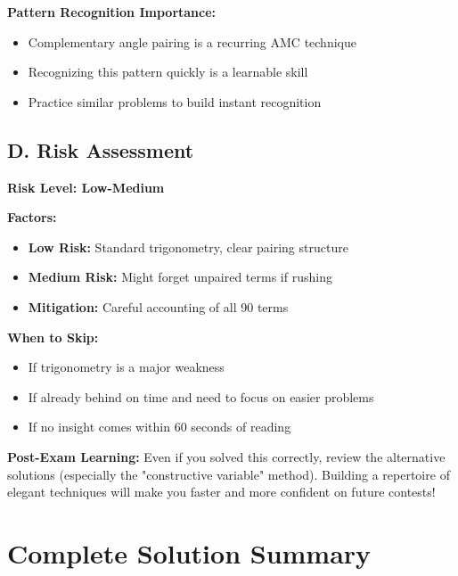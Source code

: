 \documentclass[12pt]{article}
\begin{document}
\begin{competitionbox}
\textbf{Pattern Recognition Importance:}
\begin{itemize}
    \item Complementary angle pairing is a recurring AMC technique
    \item Recognizing this pattern quickly is a learnable skill
    \item Practice similar problems to build instant recognition
\end{itemize}

\subsection*{D. Risk Assessment}

\textbf{Risk Level: Low-Medium}

\textbf{Factors:}
\begin{itemize}
    \item \textbf{Low Risk:} Standard trigonometry, clear pairing structure
    \item \textbf{Medium Risk:} Might forget unpaired terms if rushing
    \item \textbf{Mitigation:} Careful accounting of all 90 terms
\end{itemize}

\textbf{When to Skip:}
\begin{itemize}
    \item If trigonometry is a major weakness
    \item If already behind on time and need to focus on easier problems
    \item If no insight comes within 60 seconds of reading
\end{itemize}
\end{competitionbox}

\vspace{1em}

\begin{protipbox}
\textbf{Post-Exam Learning:} Even if you solved this correctly, review the alternative solutions (especially the "constructive variable" method). Building a repertoire of elegant techniques will make you faster and more confident on future contests!
\end{protipbox}

\newpage

\section*{Complete Solution Summary}
\end{document}
